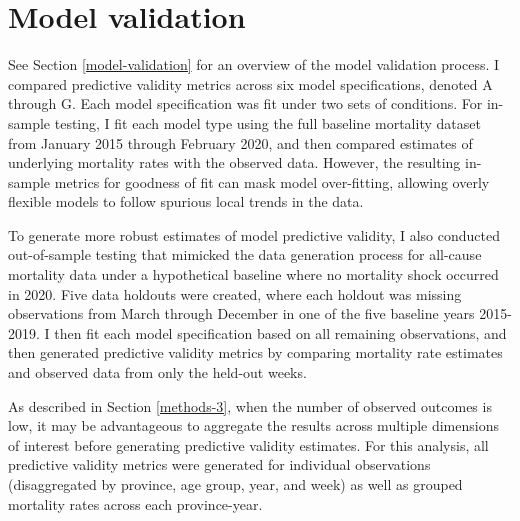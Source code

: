 \documentclass[
]{report}
\begin{document}
\hypertarget{model-validation-1}{%
\section*{Model validation}\label{model-validation-1}}

See Section \ref{model-validation} for an overview of the model validation process. I compared predictive validity metrics across six model specifications, denoted A through G. Each model specification was fit under two sets of conditions. For in-sample testing, I fit each model type using the full baseline mortality dataset from January 2015 through February 2020, and then compared estimates of underlying mortality rates with the observed data. However, the resulting in-sample metrics for goodness of fit can mask model over-fitting, allowing overly flexible models to follow spurious local trends in the data.

To generate more robust estimates of model predictive validity, I also conducted out-of-sample testing that mimicked the data generation process for all-cause mortality data under a hypothetical baseline where no mortality shock occurred in 2020. Five data holdouts were created, where each holdout was missing observations from March through December in one of the five baseline years 2015-2019. I then fit each model specification based on all remaining observations, and then generated predictive validity metrics by comparing mortality rate estimates and observed data from only the held-out weeks.

As described in Section \ref{methods-3}, when the number of observed outcomes is low, it may be advantageous to aggregate the results across multiple dimensions of interest before generating predictive validity estimates. For this analysis, all predictive validity metrics were generated for individual observations (disaggregated by province, age group, year, and week) as well as grouped mortality rates across each province-year.
\end{document}
